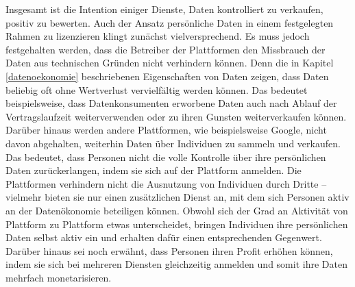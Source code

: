 \noindent Insgesamt ist die Intention einiger Dienste, Daten kontrolliert zu verkaufen, positiv zu bewerten. Auch der Ansatz persönliche Daten in einem festgelegten Rahmen zu lizenzieren klingt zunächst vielversprechend. Es muss jedoch festgehalten werden, dass die Betreiber der Plattformen den Missbrauch der Daten aus technischen Gründen nicht verhindern können. Denn die in Kapitel \ref{datenoekonomie} beschriebenen Eigenschaften von Daten zeigen, dass Daten beliebig oft ohne Wertverlust vervielfältig werden können. Das bedeutet beispielsweise, dass Datenkonsumenten erworbene Daten auch nach Ablauf der Vertragslaufzeit weiterverwenden oder zu ihren Gunsten weiterverkaufen können. Darüber hinaus werden andere Plattformen, wie beispielsweise Google, nicht davon abgehalten, weiterhin Daten über Individuen zu sammeln und verkaufen. Das bedeutet, dass Personen nicht die volle Kontrolle über ihre persönlichen Daten zurückerlangen, indem sie sich auf der Plattform anmelden. Die Plattformen verhindern nicht die Ausnutzung von Individuen durch Dritte -- vielmehr bieten sie nur einen zusätzlichen Dienst an, mit dem sich Personen aktiv an der Datenökonomie beteiligen können. Obwohl sich der Grad an Aktivität von Plattform zu Plattform etwas unterscheidet, bringen Individuen ihre persönlichen Daten selbst aktiv ein und erhalten dafür einen entsprechenden Gegenwert. Darüber hinaus sei noch erwähnt, dass Personen ihren Profit erhöhen können, indem sie sich bei mehreren Diensten gleichzeitig anmelden und somit ihre Daten mehrfach monetarisieren.
